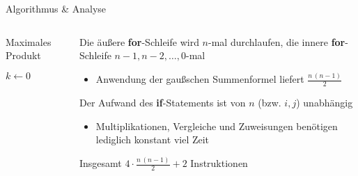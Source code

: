 \begin{frame}{Algorithmus \& Analyse}
\begin{columns}[T,onlytextwidth]
    \begin{column}{0.42\textwidth}
        \vspace{-5pt}
        \begin{algorithm}[H]
        	\caption{Maximales Produkt}
        	\label{alg:max_prod}
        	\DontPrintSemicolon
        	$k \gets 0$\;
        \end{algorithm}
    \end{column}
    \begin{column}{0.52\textwidth}
        Die \"au{\ss}ere \textbf{for}-Schleife wird $n$-mal durchlaufen, die innere \textbf{for}-Schleife $n-1, n-2, \dots, 0$-mal
        \begin{itemize}
            \item Anwendung der \alert{gaußschen Summenformel} liefert $\frac{n \, (n-1)}{2}$
        \end{itemize}
        
        Der Aufwand des \textbf{if}-Statements ist von $n$ (bzw. $i, j$) \alert{unabh\"angig}
        \begin{itemize}
            \item Multiplikationen, Vergleiche und Zuweisungen ben\"otigen lediglich \alert{konstant} viel Zeit
        \end{itemize}
        
        Insgesamt $4 \cdot \frac{n \, (n-1)}{2} + 2$ Instruktionen
    \end{column}
\end{columns}
\end{frame}


